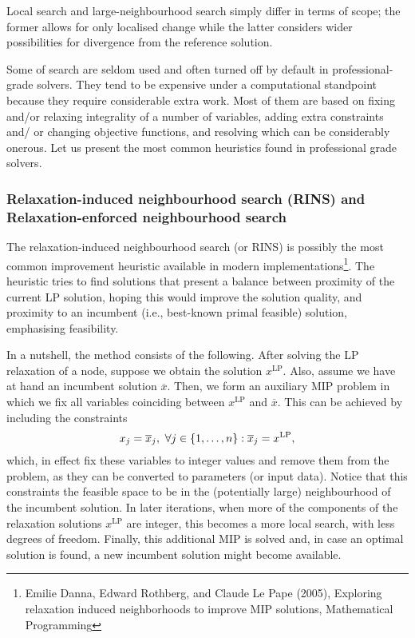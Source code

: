 Local search and large-neighbourhood search simply differ in terms of scope; the former allows for only localised change while the latter considers wider possibilities for divergence from the reference solution.

Some of search are seldom used and often turned off by default in professional-grade solvers. They tend to be expensive under a computational standpoint because they require considerable extra work. Most of them are based on fixing and/or relaxing integrality of a number of variables, adding extra constraints and/ or changing objective functions, and resolving which can be considerably onerous. Let us present the most common heuristics found in professional grade solvers. 


\subsubsection{Relaxation-induced neighbourhood search (RINS) and Relaxation-enforced neighbourhood search}

The relaxation-induced neighbourhood search (or RINS) is possibly the most common improvement heuristic available in modern implementations\footnote{Emilie Danna, Edward Rothberg, and Claude Le Pape (2005), Exploring relaxation induced neighborhoods to improve MIP solutions, Mathematical Programming}. The heuristic tries to find solutions that present a balance between proximity of the current LP solution, hoping this would improve the solution quality, and proximity to an incumbent (i.e., best-known primal feasible) solution, emphasising feasibility.

In a nutshell, the method consists of the following. After solving the LP relaxation of a node, suppose we obtain the solution $x^{\text{LP}}$. Also, assume we have at hand an incumbent solution $\overline{x}$. Then, we form an auxiliary MIP problem in which we fix all variables coinciding between $x^{\text{LP}}$ and $\overline{x}$. This can be achieved by including the constraints
	\begin{equation*}
		x_j = \overline{x}_j, \ \forall j \in \left\{ 1,\dots,n \right \} : \overline{x}_j = x^\text{LP},	
	\end{equation*}
	which,  in effect fix these variables to integer values and remove them from the problem, as they can be converted to parameters (or input data). Notice that this constraints the feasible space to be in the (potentially large) neighbourhood of the incumbent solution. In later iterations, when more of the components of the relaxation solutions $x^{\text{LP}}$ are integer, this becomes a more local search, with less degrees of freedom. Finally, this additional MIP is solved and, in case an optimal solution is found, a new incumbent solution might become available.


